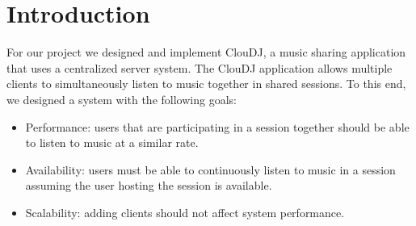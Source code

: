 \section{Introduction}
\label{sec:intro}
For our project we designed and implement ClouDJ, 
a music sharing application that uses a centralized 
server system. The ClouDJ application allows multiple 
clients to simultaneously listen to music together 
in shared sessions. To this end, we designed a system 
with the following goals:
\begin{itemize}
  \item Performance: users that are participating in 
    a session together should be able to listen to music at a similar rate.
  \item Availability: users must be able to continuously 
    listen to music in a session assuming the user hosting 
    the session is available.
  \item Scalability: adding clients should not affect system performance.
\end{itemize}
